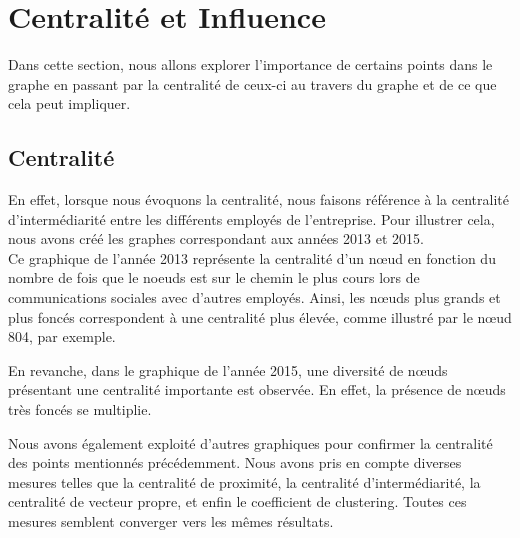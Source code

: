\documentclass{article}
\begin{document}
\section{Centralité et Influence}

Dans cette section, nous allons explorer l’importance de certains points dans le graphe en passant par la centralité de ceux-ci au travers du graphe et de ce que cela peut impliquer.

\subsection{Centralité}

En effet, lorsque nous évoquons la centralité, nous faisons référence à la centralité d'intermédiarité entre les différents employés de l'entreprise. Pour illustrer cela, nous avons créé les graphes correspondant aux années 2013 et 2015. \\

Ce graphique de l'année 2013 représente la centralité d'un nœud en fonction du nombre de fois que le noeuds est sur le chemin le plus cours lors de communications sociales avec d'autres employés. Ainsi, les nœuds plus grands et plus foncés correspondent à une centralité plus élevée, comme illustré par le nœud 804, par exemple.

En revanche, dans le graphique de l'année 2015, une diversité de nœuds présentant une centralité importante est observée. En effet, la présence de nœuds très foncés se multiplie.

Nous avons également exploité d'autres graphiques pour confirmer la centralité des points mentionnés précédemment. Nous avons pris en compte diverses mesures telles que la centralité de proximité, la centralité d'intermédiarité, la centralité de vecteur propre, et enfin le coefficient de clustering. Toutes ces mesures semblent converger vers les mêmes résultats.
\end{document}

